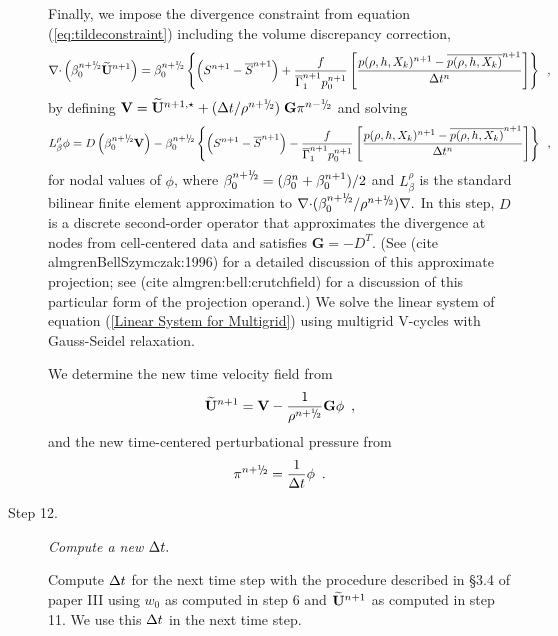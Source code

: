 \begin{description}
Finally, we impose the divergence constraint from equation (\ref{eq:tildeconstraint}) 
including the volume discrepancy correction,
\begin{equation}
\nablab \cdotb \left(\beta_0^{\nph} \Ubt^{n+1} \right)  = \beta_0^{\nph}\left\{  \left(S^{n+1} - \overline{S}^{n+1} \right)
+ \frac{f}{\gammabar^{n+1} p_0^{n+1}}
\left[\frac{p(\rho,h,X_k)^{n+1} - \overline{p(\rho,h,X_k)}^{n+1}}{\Delta t^n}\right]\right\}
\enskip,
\end{equation}
by defining ${\bf V} = \Ubt^{n+1,\star} + ( \dt / \rho^\nph ) \; \mathbf{G} \pi^\nmh$ 
and solving
\begin{equation}
 L_\beta^\rho \phi =
   D \left ( \beta_0^{\nph} {\bf V} \right) - \beta_0^{\nph}\left\{ \left(S^{n+1}-\overline{S}^{n+1} \right)
- \frac{f}{\gammabar^{n+1} p_0^{n+1}}
\left[\frac{p(\rho,h,X_k)^{n+1} - \overline{p(\rho,h,X_k)}^{n+1}}{\Delta t^n}\right]\right\} \enskip, \label{Linear System for Multigrid}
\end{equation}
for nodal values of $\phi$, where
$\beta_0^\nph = ( \beta_0^n + \beta_0^{n+1} )/2$ and
$L_\beta^\rho$ is the standard bilinear
finite element approximation to $\nablab \cdotb ({\beta_0^\nph}/{\rho^\nph}) \nablab.$
In this step, $D$ is a discrete second-order operator that approximates the 
divergence at nodes from cell-centered data and satisfies
$\mathbf{G} = -D^T.$ 
(See (cite almgrenBellSzymczak:1996) for a detailed discussion of this
approximate projection; see (cite almgren:bell:crutchfield) for a discussion
of this particular form of the projection operand.)  
We solve the linear system of equation (\ref{Linear System for Multigrid})
using multigrid V-cycles with Gauss-Seidel relaxation.

We determine the new time velocity field from
\begin{equation}
\Ubt^{n+1} = {\bf V} - \frac{1}{\rho^\nph} \mathbf{G} \phi \enskip ,
\end{equation}
and the new time-centered perturbational pressure from
\begin{equation}
  \pi^\nph = \frac{1}{\dt} \phi \enskip .
\end{equation}

\item[Step 12.] {\em Compute a new $\Delta t.$}

Compute $\Delta t$ for the next time step with the procedure described in \S 3.4 of paper III
using $w_0$ as computed in step 6 and
$\widetilde{{\bf U}}^{n+1}$ as computed in step 11.  We use this $\Delta t$ in the next time step. 


\end{description}

